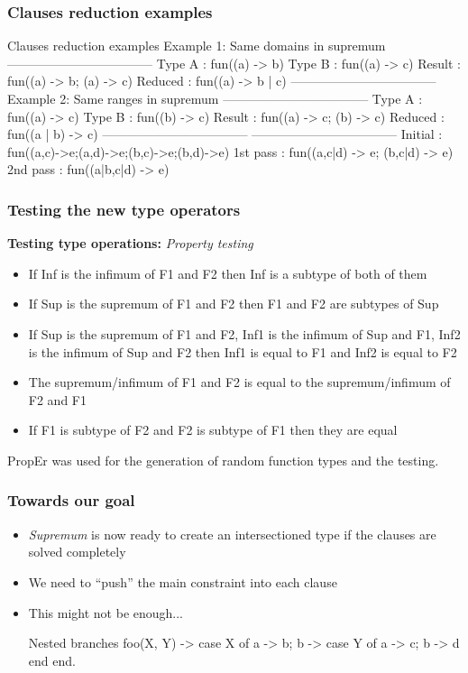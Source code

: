 \documentclass{beamer}
\begin{document}
\begin{frame}[fragile]
  \frametitle{Clauses reduction examples}
\begin{code}{Clauses reduction examples}
  Example 1: Same domains in supremum
  -----------------------------------
  Type A  : fun((a) -> b)
  Type B  : fun((a) -> c)
  Result  : fun((a) -> b; (a) -> c)
  Reduced : fun((a) -> b | c)
  -----------------------------------
  Example 2: Same ranges in supremum
  -----------------------------------
  Type A  : fun((a) -> c)
  Type B  : fun((b) -> c)
  Result  : fun((a) -> c; (b) -> c)
  Reduced : fun((a | b) -> c)
  -----------------------------------
  -----------------------------------
  Initial  : fun((a,c)->e;(a,d)->e;(b,c)->e;(b,d)->e)
  1st pass : fun((a,c|d) -> e; (b,c|d) -> e)
  2nd pass : fun((a|b,c|d) -> e)
\end{code}
\end{frame}

\begin{frame}
  \frametitle{Testing the new type operators}
  \textbf{Testing type operations:} \emph{Property testing} \pause
  \begin{itemize}
  \item If Inf is the infimum of F1 and F2 then Inf is a subtype of
    both of them
  \item If Sup is the supremum of F1 and F2 then F1 and F2 are
    subtypes of Sup
  \item If Sup is the supremum of F1 and F2, Inf1 is the infimum of
    Sup and F1, Inf2 is the infimum of Sup and F2 then Inf1 is equal
    to F1 and Inf2 is equal to F2
  \item The supremum/infimum of F1 and F2 is equal to the
    supremum/infimum of F2 and F1
  \item If F1 is subtype of F2 and F2 is subtype of F1 then they are
    equal
  \end{itemize} \pause
  PropEr was used for the generation of random function types and the
  testing.
\end{frame}

\begin{frame}[fragile]
  \frametitle{Towards our goal}
  \begin{itemize}
    \item \emph{Supremum} is now ready to create an intersectioned
      type if the clauses are solved completely \pause
    \item We need to ``push'' the main constraint into each clause \pause
    \item This might not be enough...
      \begin{code}{Nested branches}
foo(X, Y) ->
  case X of
   a -> b;
   b -> case Y of
         a -> c;
         b -> d
        end
  end.
      \end{code}
  \end{itemize}
\end{frame}
\end{document}
